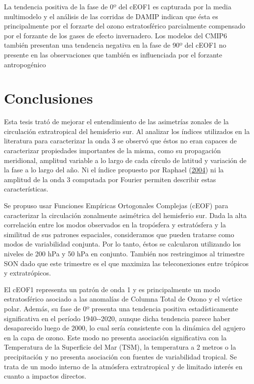 \documentclass[12pt,oneside,a4paper]{reedthesis}
\begin{document}
La tendencia positiva de la fase de 0º del cEOF1 es capturada por la media multimodelo y el análisis de las corridas de DAMIP indican que ésta es principalmente por el forzarte del ozono estratosférico parcialmente compensado por el forzante de los gases de efecto invernadero.
Los modelos del CMIP6 también presentan una tendencia negativa en la fase de 90º del cEOF1 no presente en las observaciones que también es influenciada por el forzante antropogénico

\hypertarget{conclusiones-3}{%
\chapter{Conclusiones}\label{conclusiones-3}}

Esta tesis trató de mejorar el entendimiento de las asimetrías zonales de la circulación extratropical del hemisferio sur.
Al analizar los índices utilizados en la literatura para caracterizar la onda 3 se observó que éstos no eran capaces de caracterizar propiedades importantes de la misma, como su propagación meridional, amplitud variable a lo largo de cada círculo de latitud y variación de la fase a lo largo del año.
Ni el índice propuesto por Raphael (\protect\hyperlink{ref-raphael2004}{2004}) ni la amplitud de la onda 3 computada por Fourier permiten describir estas características.

Se propuso usar Funciones Empíricas Ortogonales Complejas (cEOF) para caracterizar la circulación zonalmente asimétrica del hemisferio sur.
Dada la alta correlación entre los modos observados en la tropósfera y estratósfera y la similitud de sus patrones espaciales, consideramos que pueden tratarse como modos de variabilidad conjunta.
Por lo tanto, éstos se calcularon utilizando los niveles de 200 hPa y 50 hPa en conjunto.
También nos restringimos al trimestre SON dado que este trimestre es el que maximiza las teleconexiones entre trópicos y extratrópicos.

El cEOF1 representa un patrón de onda 1 y es principalmente un modo estratosférico asociado a las anomalías de Columna Total de Ozono y el vórtice polar.
Además, su fase de 0º presenta una tendencia positiva estadísticamente significativa en el período 1940-\/-2020, aunque dicha tendencia parece haber desaparecido luego de 2000, lo cual sería consistente con la dinámica del agujero en la capa de ozono.
Este modo no presenta asociación significativa con la Temperatura de la Superficie del Mar (TSM), la temperatura a 2 metros o la precipitación y no presenta asociación con fuentes de variabilidad tropical.
Se trata de un modo interno de la atmósfera extratropical y de limitado interés en cuanto a impactos directos.
\end{document}

